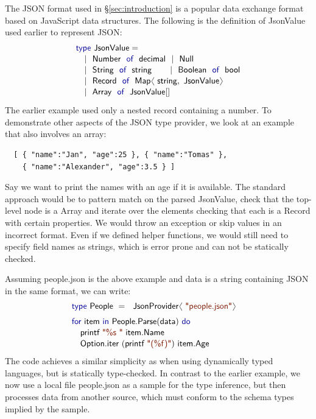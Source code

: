 \documentclass[10pt,preprint,blind,clearpagebib]{sigplanconf}
\newcommand{\langl}{\begin{picture}(4.5,7)
\put(1.1,2.5){\rotatebox{60}{\line(1,0){5.5}}}
\put(1.1,2.5){\rotatebox{300}{\line(1,0){5.5}}}
\end{picture}}
\newcommand{\rangl}{\begin{picture}(4.5,7)
\put(.9,2.5){\rotatebox{120}{\line(1,0){5.5}}}
\put(.9,2.5){\rotatebox{240}{\line(1,0){5.5}}}
\end{picture}}
\newcommand{\kvd}[1]{\textnormal{\textcolor{kvdclr}{\sffamily #1}}}
\newcommand{\str}[1]{\textnormal{\textcolor{strclr}{\sffamily "#1"}}}
\newcommand{\strf}[1]{\textnormal{\textcolor{strclr}{\sffamily #1}}}
\newcommand{\ident}[1]{\textnormal{\sffamily #1}}
\begin{document}
The JSON format used in \S\ref{sec:introduction} is a popular data exchange format based on 
JavaScript data structures. The following is the definition of \ident{JsonValue} 
used earlier to represent JSON:
%
\begin{equation*}
\begin{array}{l}
 \kvd{type}~\ident{JsonValue} = \\[0.1em]
 \quad|~ \ident{Number}~\kvd{of}~\ident{decimal} ~~|~ \ident{Null} \\[0.1em]
 \quad|~ \ident{String}~\kvd{of}~\ident{string} \qquad\, |~ \ident{Boolean}~\kvd{of}~\ident{bool} \\[0.1em]
 \quad|~ \ident{Record}~\kvd{of}~\ident{Map}\langl\ident{string}, \ident{JsonValue}\rangl \\[0.1em]
 \quad|~ \ident{Array}~\kvd{of}~\ident{JsonValue}[] \\[0.1em]
\end{array}
\end{equation*}
%
The earlier example used only a nested record containing a number. To demonstrate other 
aspects of the JSON type provider, we look at an example that also involves an array:
%
{\small{
\begin{verbatim}
  [ { "name":"Jan", "age":25 }, { "name":"Tomas" },
    { "name":"Alexander", "age":3.5 } ]
\end{verbatim}
}}
%
\noindent
Say we want to print the names with an age if it is available. The standard approach would 
be to pattern match on the parsed \ident{JsonValue}, check that the top-level node is a \ident{Array}
and iterate over the elements checking that each is a \ident{Record} with certain properties. We
would throw an exception or skip values in an incorrect format. Even if we defined helper functions, 
we would still need to specify field names as strings, which is error prone and can not be 
statically checked.

Assuming \strf{people.json} is the above example and \ident{data} is a string containing
JSON in the same format, we can write:
%
\begin{equation*}
\begin{array}{l}
 \kvd{type}~\ident{People}~=~\ident{JsonProvider}\langl\str{people.json}\rangl\hspace{1em} \\[0.6em]
 \kvd{for}~\ident{item}~\kvd{in}~\ident{People.Parse}(\ident{data})~\kvd{do}\\[0.1em]
 \quad\ident{printf}~\str{\%s }~\ident{item.Name}\\[0.1em]
 \quad\ident{Option.iter}~(\ident{printf}~\str{(\%f)})~\ident{item.Age}
\end{array}
\end{equation*}
%
The code achieves a similar simplicity as when using dynamically typed languages, but is statically 
type-checked. In contrast to the earlier example, we now use a local file \strf{people.json} as a 
sample for the type inference, but then processes data from another source, which must conform to the
schema types implied by the sample.
\end{document}
